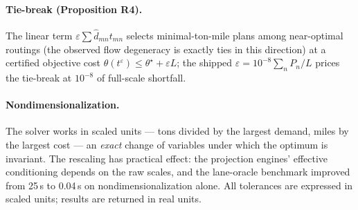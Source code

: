 \paragraph{Tie-break (Proposition R4).} The linear term
$\varepsilon \sum \hat d_{mn} t_{mn}$ selects minimal-ton-mile plans among
near-optimal routings (the observed flow degeneracy is exactly ties in this
direction) at a certified objective cost
$\theta(t^\varepsilon) \le \theta^\star + \varepsilon L$; the shipped
$\varepsilon = 10^{-8} \sum_n P_n / L$ prices the tie-break at $10^{-8}$ of
full-scale shortfall.

\paragraph{Nondimensionalization.} The solver works in scaled units ---
tons divided by the largest demand, miles by the largest cost --- an
\emph{exact} change of variables under which the optimum is invariant. The
rescaling has practical effect: the projection engines' effective
conditioning depends on the raw scales, and the lane-oracle benchmark
improved from 25\,s to 0.04\,s on nondimensionalization alone. All
tolerances are expressed in scaled units; results are returned in real
units.

